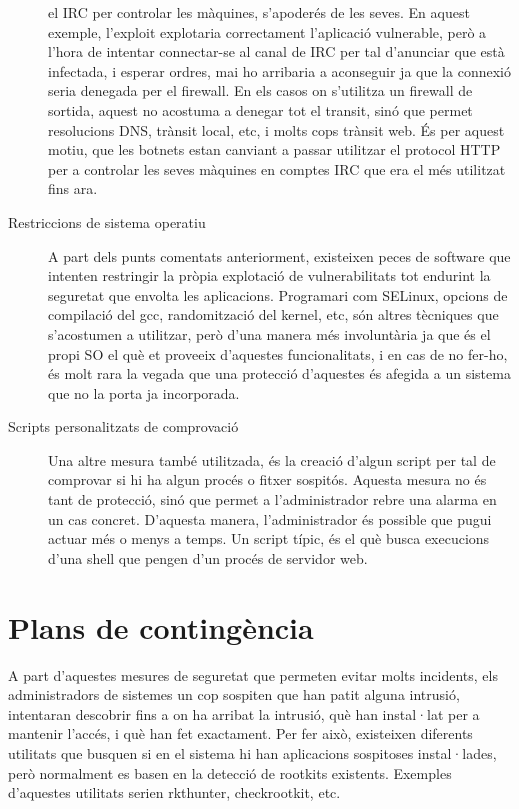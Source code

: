 \begin{description}
        el IRC per controlar les màquines, s'apoderés de les seves. En aquest exemple, l'exploit explotaria 
        correctament l'aplicació vulnerable, però a l'hora de intentar connectar-se al canal de IRC per tal
        d'anunciar que està infectada, i esperar ordres, mai ho arribaria a aconseguir ja que la connexió 
        seria denegada per el firewall. En els casos on s'utilitza un firewall de sortida, aquest no acostuma
        a denegar tot el transit, sinó que permet resolucions DNS, trànsit local, etc, i molts cops trànsit web. 
        És per aquest motiu, que les botnets estan canviant a passar utilitzar el protocol HTTP per a controlar 
        les seves màquines en comptes IRC que era el més utilitzat fins ara.
    \item[Restriccions de sistema operatiu] A part dels punts comentats anteriorment, existeixen peces de 
        software que intenten restringir la pròpia explotació de vulnerabilitats tot endurint la seguretat que 
        envolta les aplicacions. Programari com SELinux, opcions de compilació del gcc, randomització del kernel, 
        etc, són altres tècniques que s'acostumen a utilitzar, però d'una manera més involuntària ja que és 
        el propi SO el què et proveeix d'aquestes funcionalitats, i en cas de no fer-ho, és molt rara la vegada
        que una protecció d'aquestes és afegida a un sistema que no la porta ja incorporada.
    \item[Scripts personalitzats de comprovació] Una altre mesura també utilitzada, és la creació d'algun script per tal de 
        comprovar si hi ha algun procés o fitxer sospitós. Aquesta mesura no és tant de protecció, sinó que 
        permet a l'administrador rebre una alarma en un cas concret. D'aquesta manera, l'administrador és possible
        que pugui actuar més o menys a temps. Un script típic, és el què busca execucions d'una shell que pengen
        d'un procés de servidor web.
\end{description}

\section{Plans de contingència}

A part d'aquestes mesures de seguretat que permeten evitar molts incidents, els administradors de sistemes un cop
sospiten que han patit alguna intrusió, intentaran descobrir fins a on ha arribat la intrusió, què han instal·lat 
per a mantenir l'accés, i què han fet exactament. Per fer això, existeixen diferents utilitats que busquen si en 
el sistema hi han aplicacions sospitoses instal·lades, però normalment es basen en la detecció de rootkits existents.
Exemples d'aquestes utilitats serien rkthunter, checkrootkit, etc. \\


